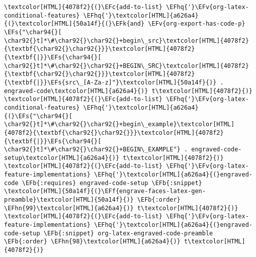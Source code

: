 \documentclass{scrartcl}
\newcommand{\EFk}[1]{\textcolor{EFk}{#1}} %
\newcommand{\EFs}[1]{\textcolor{EFs}{#1}} %
\newcommand{\EFb}[1]{\textcolor{EFb}{#1}} %
\newcommand{\EFc}[1]{\textcolor{EFc}{#1}} %
\newcommand{\EFv}[1]{\textcolor{EFv}{#1}} %
\newcommand{\EFf}[1]{\textcolor{EFf}{#1}} %
\newcommand{\EFhn}[1]{\textcolor{EFhn}{\textbf{#1}}} %
\newcommand{\EFhq}[1]{\textcolor{EFhq}{#1}} %
\begin{document}
\begin{enumerate}
\begin{Code}
\begin{Verbatim}[]
\textcolor[HTML]{4078f2}{(}\EFc{add-to-list} \EFhq{'}\EFv{org-latex-conditional-features} \EFhq{'}\textcolor[HTML]{a626a4}{(}\textcolor[HTML]{50a14f}{(}\EFk{and} \EFv{org-export-has-code-p} \EFs{"\char94{}[ \char92{}t]*\#\char92{}\char92{}+begin\_src}\textcolor[HTML]{4078f2}{\textbf{\char92{}\char92{}}}\textcolor[HTML]{4078f2}{\textbf{|}}\EFs{\char94{}[ \char92{}t]*\#\char92{}\char92{}+BEGIN\_SRC}\textcolor[HTML]{4078f2}{\textbf{\char92{}\char92{}}}\textcolor[HTML]{4078f2}{\textbf{|}}\EFs{src\_[A-Za-z]"}\textcolor[HTML]{50a14f}{)} . engraved-code\textcolor[HTML]{a626a4}{)} t\textcolor[HTML]{4078f2}{)}
\textcolor[HTML]{4078f2}{(}\EFc{add-to-list} \EFhq{'}\EFv{org-latex-conditional-features} \EFhq{'}\textcolor[HTML]{a626a4}{(}\EFs{"\char94{}[ \char92{}t]*\#\char92{}\char92{}+begin\_example}\textcolor[HTML]{4078f2}{\textbf{\char92{}\char92{}}}\textcolor[HTML]{4078f2}{\textbf{|}}\EFs{\char94{}[ \char92{}t]*\#\char92{}\char92{}+BEGIN\_EXAMPLE"} . engraved-code-setup\textcolor[HTML]{a626a4}{)} t\textcolor[HTML]{4078f2}{)}
\textcolor[HTML]{4078f2}{(}\EFc{add-to-list} \EFhq{'}\EFv{org-latex-feature-implementations} \EFhq{'}\textcolor[HTML]{a626a4}{(}engraved-code \EFb{:requires} engraved-code-setup \EFb{:snippet} \textcolor[HTML]{50a14f}{(}\EFf{engrave-faces-latex-gen-preamble}\textcolor[HTML]{50a14f}{)} \EFb{:order} \EFhn{99}\textcolor[HTML]{a626a4}{)} t\textcolor[HTML]{4078f2}{)}
\textcolor[HTML]{4078f2}{(}\EFc{add-to-list} \EFhq{'}\EFv{org-latex-feature-implementations} \EFhq{'}\textcolor[HTML]{a626a4}{(}engraved-code-setup \EFb{:snippet} org-latex-engraved-code-preamble \EFb{:order} \EFhn{98}\textcolor[HTML]{a626a4}{)} t\textcolor[HTML]{4078f2}{)}


\end{Verbatim}
\end{Code}
\end{enumerate}
\end{document}
